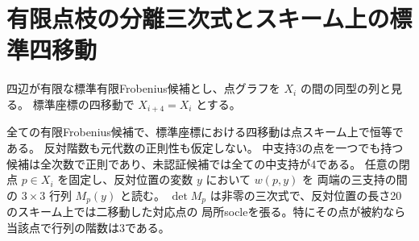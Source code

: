 \section{有限点枝の分離三次式とスキーム上の標準四移動}
\label{sec:finite-cubic-separators}
四辺が有限な標準有限Frobenius候補とし、点グラフを $X_i$ の間の同型の列と見る。
標準座標の四移動で $X_{i+4}=X_i$ とする。
\begin{theorem}\label{thm:finite-cubic-separators}
全ての有限Frobenius候補で、標準座標における四移動は点スキーム上で恒等である。
反対階数も元代数の正則性も仮定しない。
中支持3の点を一つでも持つ候補は全次数で正則であり、未認証候補では全ての中支持が4である。
任意の閉点 $p\in X_i$ を固定し、反対位置の変数 $y$ において $w(p,y)$ を
両端の三支持の間の $3\times3$ 行列 $M_p(y)$ と読む。
$\det M_p$ は非零の三次式で、反対位置の長さ20のスキーム上では二移動した対応点の
局所socleを張る。特にその点が被約なら当該点で行列の階数は3である。
\end{theorem}
